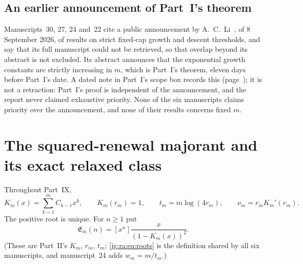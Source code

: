 \documentclass[11pt,a4paper]{article}
\theoremstyle{definition}\newaliascnt{definition}{theorem}
\theoremstyle{remark}\newaliascnt{remark}{theorem}
\begin{document}
\subsection{An earlier announcement of Part~I's theorem}
\label{jg:sec:li}
Manuscripts~30, 27, 24 and~22 cite a public announcement by
A.~C.~Li~\cite{jg:Li}, of 8 September 2026, of results on strict fixed-cap
growth and descent thresholds, and say that its full manuscript could not be
retrieved, so that overlap beyond its abstract is not excluded. Its abstract
announces that the exponential growth constants are strictly increasing in
$m$, which is Part~I's theorem, eleven days before Part~I's date. A dated note
in Part~I's scope box records this (page~\pageref{jg:rem:li}); it is not a retraction:
Part~I's proof is independent of the announcement, and the report never
claimed exhaustive priority. None of the six manuscripts claims priority over
the announcement, and none of their results concerns fixed $m$.

\section{The squared-renewal majorant and its exact relaxed class}
\label{jg:sec:majorant}
Throughout Part~IX,
\begin{equation}\label{jg:ra:eq:roots}
 K_m(x)=\sum_{k=1}^m C_{k-1}x^k,\qquad
 K_m(r_m)=1,\qquad
 t_m=m\log(4r_m),\qquad \nu_m=r_mK_m'(r_m).
\end{equation}
The positive root is unique. For $n\ge1$ put
\begin{equation}\label{jg:ra:eq:envelope}
 \mathfrak E_m(n)=[x^n]\frac{x}{(1-K_m(x))^2}.
\end{equation}
(These are Part~II's $K_m$, $r_m$, $t_m$; \eqref{jg:ra:eq:roots} is the
definition shared by all six manuscripts, and manuscript~24 adds
$w_m=m/t_m$.)
\end{document}
